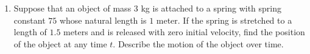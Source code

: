 \documentclass[12pt]{article}
\newif\ifans
\begin{document}
\begin{enumerate}
\begin{enumerate}
\item Suppose that an object of mass $3$ kg is attached to a spring with spring constant $75$ whose natural length is $1$ meter.  If the spring is stretched to a length of $1.5$ meters and is released with zero initial velocity, find the position of the object at any time $t$.  Describe the motion of the object over time.

\ifans{\fbox{\parbox{1\linewidth}{The position of the object at any time $t$ is $x(t)=0.5\cos{\left(5t\right)}$, so the spring will continue to oscillate indefinitely.  This type of motion
is called \underline{simple harmonic motion}.  To see an animation of this, visit the Wikipedia page: \\ \url{http://upload.wikimedia.org/wikipedia/commons/2/25/Animated-mass-spring.gif}
 }}} \fi   

 \end{enumerate}

\end{enumerate}
\end{document}
